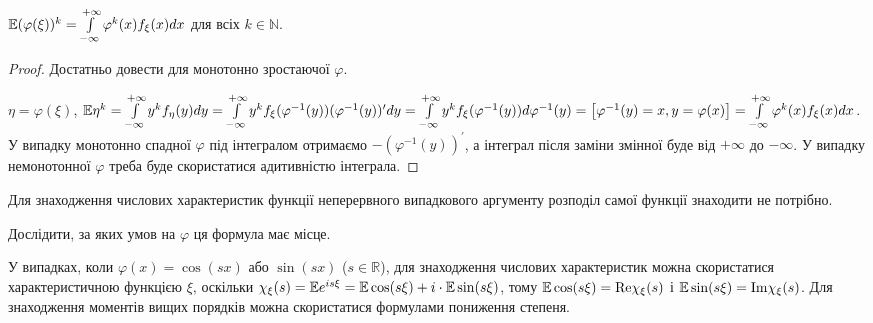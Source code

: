 \begin{proposition*}
    $\mathbb{E} (\varphi(\xi))^k = \int\limits_{-\infty}^{+\infty} \varphi^k(x) f_\xi(x) dx$ для всіх $k \in \mathbb{N}$.
\end{proposition*}
\begin{proof}
    Достатньо довести для монотонно зростаючої $\varphi$.

    \noindent$\eta = \varphi(\xi)$, $\mathbb{E}\eta^k = \int\limits_{-\infty}^{+\infty} y^k f_\eta(y) dy = \int\limits_{-\infty}^{+\infty} y^k f_\xi (\varphi^{-1} (y)) (\varphi^{-1} (y))^\prime dy =
    \int\limits_{-\infty}^{+\infty} y^k f_\xi(\varphi^{-1} (y)) d \varphi^{-1} (y) = \left[ \varphi^{-1} (y) = x, y = \varphi(x)\right] = \int\limits_{-\infty}^{+\infty} \varphi^k(x) f_\xi(x) dx$.
    У випадку монотонно спадної $\varphi$ під інтегралом отримаємо $-(\varphi^{-1} (y))^\prime$, а інтеграл після заміни змінної буде від $+\infty$ до $-\infty$.
    У випадку немонотонної $\varphi$ треба буде скористатися адитивністю інтеграла.
\end{proof}

\begin{remark}
    Для знаходження числових характеристик функції неперервного випадкового аргументу розподіл самої функції знаходити не потрібно.
\end{remark}

\begin{exercise}
    Дослідити, за яких умов на $\varphi$ ця формула має місце.
\end{exercise}

У випадках, коли $\varphi(x) = \cos (s x)$ або $\sin (s x)$ ($s\in \mathbb{R}$),
для знаходження числових характеристик можна скористатися характеристичною функцією $\xi$,
оскільки $\chi_{\xi}(s) = \mathbb{E} e^{i s \xi} = \mathbb{E} \cos(s\xi) + i \cdot\mathbb{E}\sin(s\xi)$,
тому $\mathbb{E}\cos(s\xi) = \mathrm{Re} \chi_{\xi}(s)$ і
$\mathbb{E}\sin(s\xi) = \mathrm{Im} \chi_{\xi}(s)$.
Для знаходження моментів вищих порядків можна скористатися формулами пониження степеня.